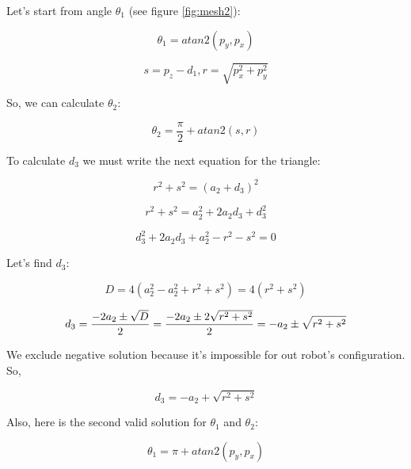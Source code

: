\documentclass[12pt, a4paper]{report}
\begin{document}
Let's start from angle $\theta_1$ (see figure \ref{fig:mesh2}):

\begin{equation}
        \theta_1 = atan2(p_y, p_x)
\end{equation}

\begin{equation}
        s = p_z - d_1, 
        r = \sqrt{p_x^2+p_y^2}
\end{equation}

So, we can calculate $\theta_2$:

\begin{equation}
        \theta_2 = \frac{\pi}{2}+atan2(s, r)
\end{equation}

To calculate $d_3$ we must write the next equation for the triangle:

\begin{equation}
        r^2 +s^2 = {(a_2+d_3)}^2
\end{equation}

\begin{equation}
        r^2 +s^2 = a_2^2+2a_2d_3+d_3^2
\end{equation}


\begin{equation}
        d_3^2+2a_2d_3+a_2^2 -r^2-s^2 = 0 
\end{equation}

Let's find $d_3$:

\begin{equation}
        D = 4(a_2^2-a_2^2+r^2+s^2) = 4(r^2+s^2)
\end{equation}

\begin{equation}
	        d_3 = {{-2a_2 \pm \sqrt{D}}\over{2}} = {{-2a_2 \pm 2\sqrt{r^2+s^2}}\over{2}} = -a_2 \pm \sqrt{r^2+s^2}
\end{equation}

We exclude negative solution because it's impossible for out robot's configuration. So, 

\begin{equation}
	        d_3 = -a_2 + \sqrt{r^2+s^2}
\end{equation}

Also, here is the second valid solution for $\theta_1$ and $\theta_2$:

\begin{equation}
        \theta_1 = \pi + atan2(p_y, p_x)
\end{equation}
\end{document}
